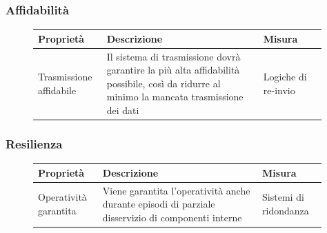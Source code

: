 \documentclass{article}
\begin{document}
\subsubsection{Affidabilità}\label{rnf_4}
\begin{description}
	\item[]
	    
	\begin{table}[!htbp]
		\begin{tabular} {|>{\raggedright\arraybackslash}m{0.20\linewidth} | >{\raggedright\arraybackslash}m{0.50\linewidth}|>{\raggedright\arraybackslash}m{0.20\linewidth}|}
			\hline
			\textbf{Proprietà}                                                                                                                           &   
			\textbf{Descrizione}                                                                                                                          &   
			\textbf{Misura} \\ \hline
			Trasmissione affidabile                                                                                                                       &   
			Il sistema di trasmissione dovrà garantire la più alta affidabilità possibile, così da ridurre al minimo la mancata trasmissione dei dati &   
			Logiche di re-invio \\ \hline
		\end{tabular}
	\end{table}
\end{description}

\subsubsection{Resilienza}\label{rnf_5}
\begin{description}
	\item[]
	    
	\begin{table}[!htbp]
		\begin{tabular} {|>{\raggedright\arraybackslash}m{0.20\linewidth} | >{\raggedright\arraybackslash}m{0.50\linewidth}|>{\raggedright\arraybackslash}m{0.20\linewidth}|}
			\hline
			\textbf{Proprietà}    & \textbf{Descrizione}                                                                                 & \textbf{Misura}       \\ \hline
			Operatività garantita & Viene garantita l'operatività anche durante episodi di parziale disservizio di componenti interne & Sistemi di ridondanza \\ \hline
		\end{tabular}
	\end{table}
	    
\end{description}
\end{document}
